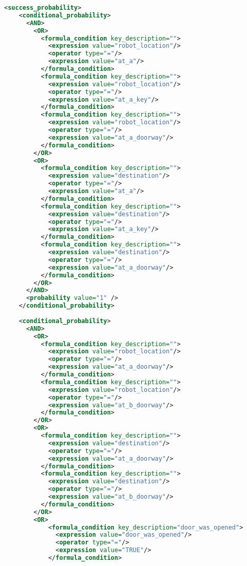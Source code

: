 \begin{lstlisting}[style=stylexml,language=XML]
  <success_probability>
    <conditional_probability>
      <AND>
        <OR>
          <formula_condition key_description="">
            <expression value="robot_location"/>
            <operator type="="/>
            <expression value="at_a"/>
          </formula_condition>
          <formula_condition key_description="">
            <expression value="robot_location"/>
            <operator type="="/>
            <expression value="at_a_key"/>
          </formula_condition>
          <formula_condition key_description="">
            <expression value="robot_location"/>
            <operator type="="/>
            <expression value="at_a_doorway"/>
          </formula_condition>
        </OR>
        <OR>
          <formula_condition key_description="">
            <expression value="destination"/>
            <operator type="="/>
            <expression value="at_a"/>
          </formula_condition>
          <formula_condition key_description="">
            <expression value="destination"/>
            <operator type="="/>
            <expression value="at_a_key"/>
          </formula_condition>
          <formula_condition key_description="">
            <expression value="destination"/>
            <operator type="="/>
            <expression value="at_a_doorway"/>
          </formula_condition>
        </OR>
      </AND>
      <probability value="1" />
    </conditional_probability>
    
    <conditional_probability>
      <AND>
        <OR>
          <formula_condition key_description="">
            <expression value="robot_location"/>
            <operator type="="/>
            <expression value="at_a_doorway"/>
          </formula_condition>
          <formula_condition key_description="">
            <expression value="robot_location"/>
            <operator type="="/>
            <expression value="at_b_doorway"/>
          </formula_condition>
        </OR>
        <OR>
          <formula_condition key_description="">
            <expression value="destination"/>
            <operator type="="/>
            <expression value="at_a_doorway"/>
          </formula_condition>
          <formula_condition key_description="">
            <expression value="destination"/>
            <operator type="="/>
            <expression value="at_b_doorway"/>
          </formula_condition>
        </OR>
        <OR>
            <formula_condition key_description="door_was_opened">
              <expression value="door_was_opened"/>
              <operator type="="/>
              <expression value="TRUE"/>
            </formula_condition>
            

\end{lstlisting}
